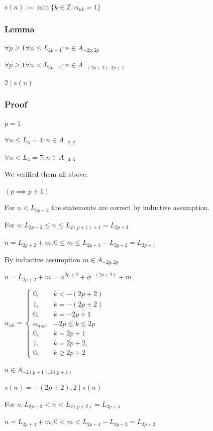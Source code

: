 \documentclass{article}
\begin{document}
\( s(n) := \min \{ k \in \mathbb{Z} : \alpha_{nk} = 1 \} \)

\subsubsection*{Lemma}

\( \forall p \geq 1 \forall n \leq L_{2p+1}: n \in A_{-2p,2p} \)

\( \forall p \geq 1 \forall n < L_{2p+2}: n \in A_{-(2p+2),2p+1} \)

\( 2 \mid s(n) \)

\subsubsection*{Proof}

\( p = 1 \)

\( \forall n \leq L_3 = 4: n \in A_{-2,2} \)

\( \forall n < L_4 = 7: n \in A_{-4,3} \)

We verified them all above.

\( (p \implies p + 1) \)

For \( n < L_{2p+2} \) the statements are correct by inductive assumption.

For \( n: L_{2p+2} \leq n \leq L_{2(p+1) + 1} = L_{2p+3} \)

\( n = L_{2p+2} + m, 0 \leq m \leq L_{2p+3} - L_{2p+2} = L_{2p+1} \)

By inductive assumption \( m \in A_{-2p,2p} \)

\( n = L_{2p+2} + m = \phi^{2p+2} + \phi^{-(2p+2)} + m \)

\( \alpha_{nk} = \left\{\begin{array}{ll} 0, & k < -(2p+2)\\1, & k = -(2p+2)\\0, & k = -2p+1\\\alpha_{mk}, & -2p \leq k \leq 2p \\ 0, & k = 2p + 1\\ 1, & k = 2p+2, \\ 0, & k \geq 2p + 2 \end{array}\right. \)

\( n \in A_{-2(p+1),2(p+1)} \)

\( s(n) = -(2p+2), 2 \mid s(n) \)

For \( n: L_{2p+3} < n < L_{2(p+2)} = L_{2p+4} \)

\( n = L_{2p+3} + m, 0 < m < L_{2p+4} - L_{2p+3} = L_{2p+2} \)
\end{document}

